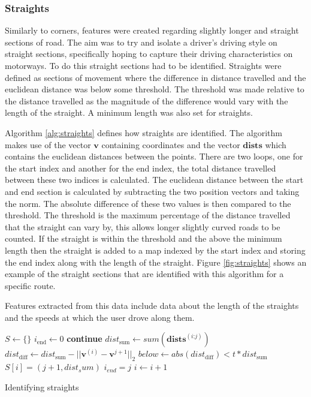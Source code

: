 \documentclass[a4paper, 11pt, twocolumn]{report}
\begin{document}
\subsubsection{Straights}

Similarly to corners, features were created regarding slightly longer and straight sections of road.
The aim was to try and isolate a driver's driving style on straight sections, specifically hoping to capture their driving characteristics on motorways.
To do this straight sections had to be identified.
Straights were defined as sections of movement where the difference in distance travelled and the euclidean distance was below some threshold.
The threshold was made relative to the distance travelled as the magnitude of the difference would vary with the length of the straight.
A minimum length was also set for straights.

Algorithm \ref{alg:straights} defines how straights are identified.
The algorithm makes use of the vector $\mathbf{v}$ containing coordinates and the vector $\mathbf{dists}$ which contains the euclidean distances between the points.
There are two loops, one for the start index and another for the end index, the total distance travelled between these two indices is calculated.
The euclidean distance between the start and end section is calculated by subtracting the two position vectors and taking the norm.
The absolute difference of these two values is then compared to the threshold.
The threshold is the maximum percentage of the distance travelled that the straight can vary by, this allows longer slightly curved roads to be counted.
If the straight is within the threshold and the above the minimum length then the straight is added to a map indexed by the start index and storing the end index along with the length of the straight.
Figure \ref{fig:straights} shows an example of the straight sections that are identified with this algorithm for a specific route.

Features extracted from this data include data about the length of the straights and the speeds at which the user drove along them.

\begin{algorithm}
\begin{algorithmic}
    \State $S \gets \{\}$
    \State $i_{\text{end}} \gets 0$
            \State \textbf{continue}
        \EndIf
            \State $dist_{\text{sum}} \gets sum(\mathbf{dists}^{(i\text{:}j)})$
            \State $dist_{\text{diff}} \gets dist_{\text{sum}} - ||\mathbf{v}^{(i)} - \mathbf{v}^{j+1}||_2$
            \State $below \gets abs(dist_{\text{diff}}) < t * dist_{\text{sum}}$
                \State $S[i] = (j+1, dist_sum)$
                \State $i_{end} = j$
            \EndIf
        \EndFor
        \State $i \gets i+1$
    \EndWhile
\end{algorithmic}
\caption{Identifying straights}
\label{alg:straights}
\end{algorithm}
\end{document}
